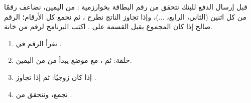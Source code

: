 \begin{statement}
قبل إرسال الدفع للبنك نتحقق من رقم البطاقة بخوارزمية \textbf{}: من اليمين، نضاعف رقمًا من كل اثنين (الثاني، الرابع، ...)، وإذا تجاوز الناتج  نطرح ، ثم نجمع كل الأرقام؛ الرقم صالح إذا كان المجموع يقبل القسمة على . اكتب البرنامج لرقم من  خانة.
\end{statement}
\begin{stepsbox}\begin{enumerate}
\item نقرأ الرقم في .
\item حلقة:  ثم ، مع موضع  يبدأ من  من اليمين.
\item إذا كان  زوجيًا:  ثم  إذا تجاوز .
\item نجمع، ونتحقق من .
\end{enumerate}\end{stepsbox}
